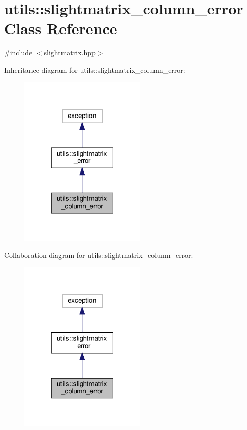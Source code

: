 \hypertarget{classutils_1_1slightmatrix__column__error}{}\section{utils\+:\+:slightmatrix\+\_\+column\+\_\+error Class Reference}
\label{classutils_1_1slightmatrix__column__error}


{\ttfamily \#include $<$slightmatrix.\+hpp$>$}



Inheritance diagram for utils\+:\+:slightmatrix\+\_\+column\+\_\+error\+:\nopagebreak
\begin{figure}[H]
\begin{center}
\leavevmode
\includegraphics[width=171pt]{classutils_1_1slightmatrix__column__error__inherit__graph}
\end{center}
\end{figure}


Collaboration diagram for utils\+:\+:slightmatrix\+\_\+column\+\_\+error\+:\nopagebreak
\begin{figure}[H]
\begin{center}
\leavevmode
\includegraphics[width=171pt]{classutils_1_1slightmatrix__column__error__coll__graph}
\end{center}
\end{figure}


